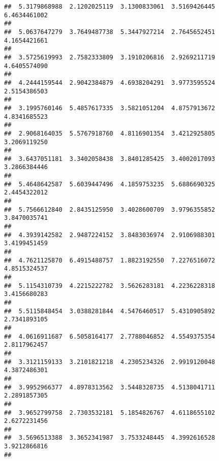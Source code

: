 \documentclass[]{article}
\begin{document}
\begin{verbatim}
##  5.3179868988  2.1202025119  3.1300833061  3.5169426445  6.4634461002 
##                                                                       
##  5.0637647279  3.7649487738  5.3447927214  2.7645652451  4.1654421661 
##                                                                       
##  3.5725619993  2.7582333809  3.1910206816  2.9269211719  4.6405574090 
##                                                                       
##  4.2444159544  2.9042384879  4.6938204291  3.9773595524  2.5154386503 
##                                                                       
##  3.1995760146  5.4857617335  3.5821051204  4.8757913672  4.8341685523 
##                                                                       
##  2.9068164035  5.5767918760  4.8116901354  3.4212925805  3.2069119250 
##                                                                       
##  3.6437051181  3.3402058438  3.8401285425  3.4002017093  3.2866384446 
##                                                                       
##  5.4648642587  5.6039447496  4.1859753235  5.6886690325  2.4454322012 
##                                                                       
##  5.7566612840  2.8435125950  3.4028600709  3.9796355852  3.8470035741 
##                                                                       
##  4.3939142582  2.9487224152  3.8483036974  2.9106988301  3.4199451459 
##                                                                       
##  4.7621125870  6.4915488757  1.8823192550  7.2276516072  4.8515324537 
##                                                                       
##  5.1154310739  4.2215222782  3.5626283181  4.2236228318  3.4156680283 
##                                                                       
##  5.5115848454  3.0388281844  4.5476460517  5.4310905892  2.7341893105 
##                                                                       
##  4.0616911687  6.5058164177  2.7788046852  4.5549375354  2.8117962457 
##                                                                       
##  3.3121159133  3.2101821218  4.2305234326  2.9919120048  4.3872486301 
##                                                                       
##  3.9952966377  4.8978313562  3.5448328735  4.5138041711  2.2891857305 
##                                                                       
##  3.9652799758  2.7303532181  5.1854826767  4.6118655102  2.6272231456 
##                                                                       
##  3.5696513388  3.3652341987  3.7533248445  4.3992616528  3.9212866816 
##                                                                       

\end{verbatim}
\end{document}
